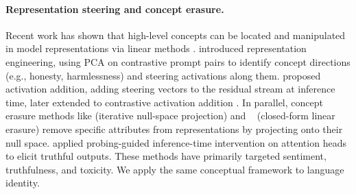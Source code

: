 \paragraph{Representation steering and concept erasure.}
Recent work has shown that high-level concepts can be located and manipulated in model representations via linear methods \citep{pmlr-v235-park24c}.
\citet{zou2025representationengineeringtopdownapproach} introduced representation engineering, using PCA on contrastive prompt pairs to identify concept directions (e.g., honesty, harmlessness) and steering activations along them.
\citet{turner2024steeringlanguagemodelsactivation} proposed activation addition, adding steering vectors to the residual stream at inference time, later extended to contrastive activation addition \citep{rimsky-etal-2024-steering}.
In parallel, concept erasure methods like \citet{ravfogel-etal-2020-null} (iterative null-space projection) and ~\citet{belrose2025leaceperfectlinearconcept} (closed-form linear erasure) remove specific attributes from representations by projecting onto their null space.
\citet{li2024inferencetimeinterventionelicitingtruthful} applied probing-guided inference-time intervention on attention heads to elicit truthful outputs.
These methods have primarily targeted sentiment, truthfulness, and toxicity.
We apply the same conceptual framework to language identity.